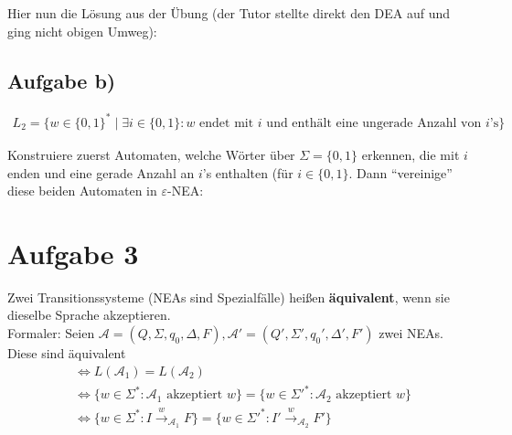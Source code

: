 \documentclass[12pt,a4paper]{article}
\newcommand{\A}{\mathcal{A}}
\begin{document}
Hier nun die Lösung aus der Übung (der Tutor stellte direkt den DEA auf und ging nicht obigen Umweg):

\usetikzlibrary{positioning,automata}

\subsection*{Aufgabe b)}
\begin{align*}
L_2=\big\lbrace w\in\lbrace0,1\rbrace^\ast\mid\exists i\in\lbrace0,1\rbrace:w\text{ endet mit $i$ und enthält eine ungerade Anzahl von $i$'s}\big\rbrace
\end{align*}

Konstruiere zuerst Automaten, welche Wörter über $\Sigma=\lbrace 0,1\rbrace$ erkennen, die mit $i$ enden und eine gerade Anzahl an $i$'s enthalten (für $i\in\lbrace0,1\rbrace$. Dann ``vereinige'' diese beiden Automaten in $\varepsilon$-NEA: 

\section*{Aufgabe 3}
Zwei Transitionssysteme (NEAs sind Spezialfälle) heißen \textbf{äquivalent}, wenn sie dieselbe Sprache akzeptieren.\\
Formaler: Seien $\A=(Q,\Sigma,q_0,\Delta,F),\A'=(Q',\Sigma',q_0',\Delta',F')$ zwei NEAs. Diese sind äquivalent
\begin{align*}
&\Longleftrightarrow L(\A_1)=L(\A_2)\\
&\Longleftrightarrow \big\lbrace w\in\Sigma^\ast:\A_1\text{ akzeptiert }w\big\rbrace
=\big\lbrace w\in\Sigma'^\ast:\A_2\text{ akzeptiert }w\big\rbrace\\
&\Longleftrightarrow\big\lbrace w\in\Sigma^\ast:I\stackrel{w}{\longrightarrow}_{\A_1} F\big\rbrace=
\big\lbrace w\in\Sigma'^\ast:I'\stackrel{w}{\longrightarrow}_{\A_2} F'\big\rbrace
\end{align*}
\end{document}
